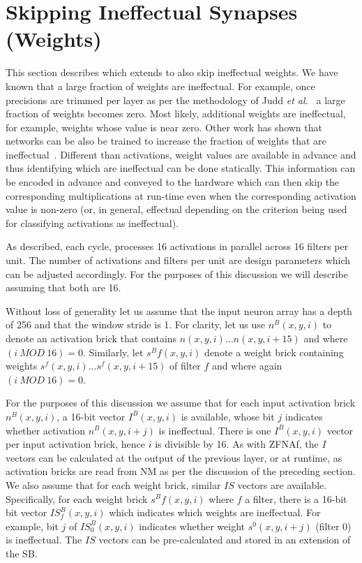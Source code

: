\section{Skipping Ineffectual Synapses (Weights)}
\label{sec:weight_skipping}
This section describes \ZFLn which extends \ZFL to also skip ineffectual weights. We have known that a large fraction of weights are ineffectual. For example, once precisions are trimmed per layer as per the methodology of Judd \textit{et al.}~\cite{judd:reduced} a large fraction of weights becomes zero. Most likely, additional weights are ineffectual, for example, weights whose value is near zero. Other work has shown that networks can be also be trained to increase the fraction of weights that are ineffectual~\cite{weightsharing}. Different than activations, weight values are available in advance and thus identifying which are ineffectual can be done statically. This information can be encoded in advance and conveyed to the hardware which can then skip the corresponding multiplications at run-time even when the corresponding activation value is non-zero (or, in general, effectual depending on the criterion being used for classifying activations as ineffectual). 

As described, each cycle, \ZFL processes 16 activations in parallel across 16 filters per unit. The number of activations and filters per unit are design parameters which can be adjusted accordingly. For the purposes of this discussion we will describe \ZFLn assuming that both are 16.

Without loss of generality let us assume that the input neuron array has a depth of 256 and that the window stride is 1. For clarity, let us use $n^B(x,y,i)$ to denote an activation brick that contains $n(x,y,i)...n(x,y,i+15)$ and where $(i\   MOD\  16) = 0$. Similarly, let $s^Bf(x,y,i)$ denote a weight brick containing weights $s^f(x,y,i)...s^f(x,y,i+15)$ of filter $f$ and where again $(i\  MOD\  16)=0$.

%
For the purposes of this discussion we assume that for each input activation brick $n^B(x,y,i)$, a 16-bit vector $I^B(x,y,i)$ is available, whose bit $j$ indicates whether activation $n^B(x,y,i+j)$ is ineffectual. There is one $I^B(x,y,i)$ vector per input activation brick, hence $i$ is divisible by 16. As with ZFNAf, the $I$ vectors can be calculated at the output of the previous layer, or at runtime, as activation bricks are read from NM as per the discussion of the preceding section. We also assume that for each weight brick, similar $IS$ vectors are available.  Specifically, for each weight brick $s^Bf(x,y,i)$ where $f$ a filter, there is a 16-bit bit vector $IS^B_f(x,y,i)$ which indicates which weights are ineffectual. For example, bit $j$ of $IS^B_0(x,y,i)$ indicates whether weight $s^0(x,y,i+j)$ (filter 0) is ineffectual. The $IS$ vectors can be pre-calculated and stored in an extension of the SB. 


